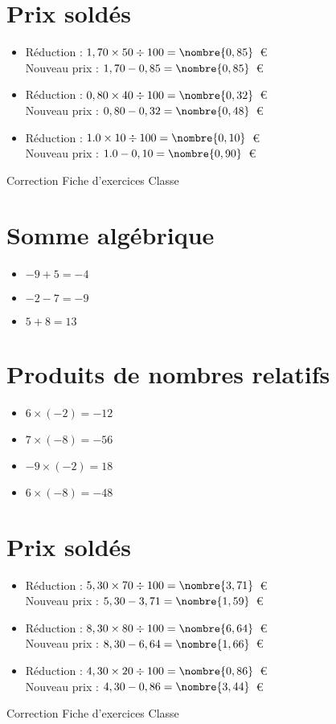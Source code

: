 \documentclass[a4paper,11pt,fleqn]{article}
\begin{document}
\section{Prix soldés}
\begin{itemize}

  \item Réduction : $1,70\times50\div100=\nombre{0,85}$~€\\
  Nouveau prix : $1,70-0,85=\nombre{0,85}$~€
  \item Réduction : $0,80\times40\div100=\nombre{0,32}$~€\\
  Nouveau prix : $0,80-0,32=\nombre{0,48}$~€
  \item Réduction : $1.0\times10\div100=\nombre{0,10}$~€\\
  Nouveau prix : $1.0-0,10=\nombre{0,90}$~€
\end{itemize}
\newpage
\setcounter{exo}{0}
\setcounter{section}{0}
{Correction} \hfill {\huge Fiche d'exercices } \hfill {Classe}

\section{Somme algébrique}
\begin{itemize}

  \item $-9 +5=-4$
  \item $-2 -7=-9$
  \item $5 +8=13$
\end{itemize}

\section{Produits de nombres relatifs}
\begin{itemize}

  \item $6\times(-2)=-12$
  \item $7\times(-8)=-56$
  \item $-9\times(-2)=18$
  \item $6\times(-8)=-48$
\end{itemize}

\section{Prix soldés}
\begin{itemize}

  \item Réduction : $5,30\times70\div100=\nombre{3,71}$~€\\
  Nouveau prix : $5,30-3,71=\nombre{1,59}$~€
  \item Réduction : $8,30\times80\div100=\nombre{6,64}$~€\\
  Nouveau prix : $8,30-6,64=\nombre{1,66}$~€
  \item Réduction : $4,30\times20\div100=\nombre{0,86}$~€\\
  Nouveau prix : $4,30-0,86=\nombre{3,44}$~€
\end{itemize}
\newpage
\setcounter{exo}{0}
\setcounter{section}{0}
{Correction} \hfill {\huge Fiche d'exercices } \hfill {Classe}
\end{document}
